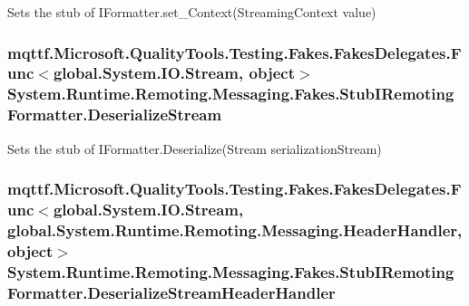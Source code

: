 Sets the stub of I\-Formatter.\-set\-\_\-\-Context(\-Streaming\-Context value)

\hypertarget{class_system_1_1_runtime_1_1_remoting_1_1_messaging_1_1_fakes_1_1_stub_i_remoting_formatter_a32d8b6d78e47847bdb8b35ce1da8695f}{
\subsubsection[{Deserialize\-Stream}]{\setlength{\rightskip}{0pt plus 5cm}mqttf.\-Microsoft.\-Quality\-Tools.\-Testing.\-Fakes.\-Fakes\-Delegates.\-Func$<$global.\-System.\-I\-O.\-Stream, object$>$ System.\-Runtime.\-Remoting.\-Messaging.\-Fakes.\-Stub\-I\-Remoting\-Formatter.\-Deserialize\-Stream}}\label{class_system_1_1_runtime_1_1_remoting_1_1_messaging_1_1_fakes_1_1_stub_i_remoting_formatter_a32d8b6d78e47847bdb8b35ce1da8695f}


Sets the stub of I\-Formatter.\-Deserialize(\-Stream serialization\-Stream)

\hypertarget{class_system_1_1_runtime_1_1_remoting_1_1_messaging_1_1_fakes_1_1_stub_i_remoting_formatter_aaab66c493fbfaa35b6699ef7679e1f8c}{
\subsubsection[{Deserialize\-Stream\-Header\-Handler}]{\setlength{\rightskip}{0pt plus 5cm}mqttf.\-Microsoft.\-Quality\-Tools.\-Testing.\-Fakes.\-Fakes\-Delegates.\-Func$<$global.\-System.\-I\-O.\-Stream, global.\-System.\-Runtime.\-Remoting.\-Messaging.\-Header\-Handler, object$>$ System.\-Runtime.\-Remoting.\-Messaging.\-Fakes.\-Stub\-I\-Remoting\-Formatter.\-Deserialize\-Stream\-Header\-Handler}}\label{class_system_1_1_runtime_1_1_remoting_1_1_messaging_1_1_fakes_1_1_stub_i_remoting_formatter_aaab66c493fbfaa35b6699ef7679e1f8c}


